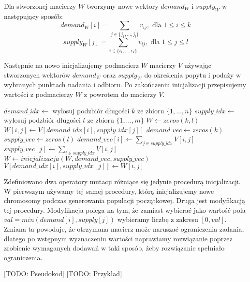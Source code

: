 Dla stworzonej macierzy $W$ tworzymy nowe wektory $demand_W$ i $supply_W$ w następujący sposób:
$$demand_W[i] = \sum_{j \in \{j_1, \dots, j_l\}} v_{ij}, \text{ dla } 1 \le i \le k$$
$$supply_W[j] = \sum_{i \in \{i_1, \dots, i_k\}} v_{ij}, \text{ dla } 1 \le j \le l$$

Następnie na nowo inicjalizujemy podmacierz $W$ macierzy $V$ używając stworzonych wektorów $demand_W$ oraz $supply_W$ do określenia popytu i podaży
w wybranych punktach nadania i odbioru. Po zakończeniu inicjalizacji przepisujemy wartości z podmacierzy $W$ z powrotem do macierzy $V$.

\begin{pseudokod}
    $demand\_idx \gets$ wylosuj podzbiór długości $k$ ze zbioru $\{1, \dots, n\}$\;
    $supply\_idx \gets$ wylosuj podzbiór długości $l$ ze zbioru $\{1, \dots, m\}$\;
    $W \gets zeros(k, l)$ 
     {
         {
            $W[i, j] \gets V[demand\_idx[i], supply\_idx[j]]$\;
        }
    }
    $demand\_vec \gets zeros(k)$ 
    $supply\_vec \gets zeros(l)$ 
     {
        $demand\_vec[i] \gets \sum_{j \in supply\_idx} V[i, j]$\;
    }
     {
        $supply\_vec[j] \gets \sum_{i \in supply\_idx} V[i, j]$\;
    }
    $W \gets inicjalizacja(W, demand\_vec, supply\_vec)$\;
     {
         {
            $V[demand\_idx[i], supply\_idx[j]] \gets W[i, j]$\;
        }
    }
\end{pseudokod}

Zdefiniowano dwa operatory mutacji różniące się jedynie procedurą inicjalizacji. W pierwszym używamy tej samej procedury, którą inicjalizujemy 
nowe chromosomy podczas generowania populacji początkowej. Druga jest modyfikacją tej procedury. Modyfikacja polega na tym, że zamiast wybierać 
jako wartość pola $val = min(demand[i], supply[j])$ wybieramy liczbę z zakresu $[0, val]$. Zmiana ta powoduje, że otrzymana macierz może naruszać 
ograniczenia zadania, dlatego po wstępnym wyznaczeniu wartości naprawiamy rozwiązanie poprzez zrobienie wymaganych dodawań w taki sposób, żeby 
rozwiązanie spełniało ograniczenia.

[TODO: Pseudokod]
[TODO: Przykład]

